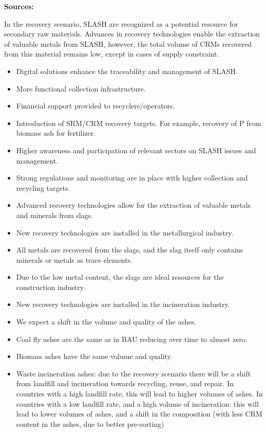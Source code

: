 \wasteSubsubsecSLASH 
\textbf{Sources:}~\cite{eurofer2023steel,euroal2023aluminium,vogl2020steelgreen,visualcapitalist2023steel,asquer2019ash}

In the recovery scenario, SLASH are recognized as a potential resource for secondary raw materials. Advances in recovery technologies enable the extraction of valuable metals from SLASH, however, the total volume of CRMs recovered from this material remains low, except in cases of supply constraint.

\begin{itemize}
   \item Digital solutions enhance the traceability and management of SLASH.
   \item More functional collection infrastructure.
   \item Financial support provided to recyclers/operators.
   \item Introduction of SRM/CRM recovery targets. For example, recovery of P from biomass ash for fertilizer.
   \item Higher awareness and participation of relevant sectors on SLASH issues and management.
   \item Strong regulations and monitoring are in place with higher collection and recycling targets.
 \end{itemize}



\begin{itemize}
\item Advanced recovery technologies allow for the extraction of valuable metals and minerals from slags.
\item New recovery technologies are installed in the metallurgical industry. 
\item All metals are recovered from the slags, and the slag itself only contains minerals or metals as trace elements.
\item Due to the low metal content, the slags are ideal resources for the construction industry.
\end{itemize}

\begin{itemize}
\item New recovery technologies are installed in the incineration industry.
\item We expect a shift in the volume and quality of the ashes.
\item Coal fly ashes are the same as in BAU reducing over time to almost zero.
\item Biomass ashes have the same volume and quality.
\item Waste incineration ashes: due to the recovery scenario there will be a shift from landfill and incineration towards recycling,  reuse, and repair. In countries with a high landfill rate, this will lead to higher volumes of ashes. In countries with a low landfill rate, and a high volume of incineration: this will lead to lower volumes of ashes, and a shift in the composition (with less CRM content in the ashes, due to better pre-sorting)
\end{itemize}


